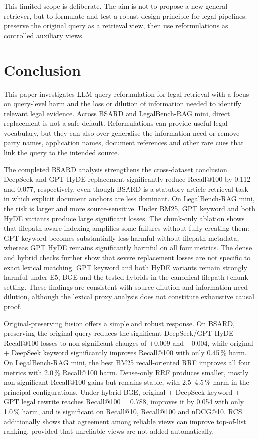 \documentclass[a4paper,fleqn]{cas-dc}
\begin{document}
This limited scope is deliberate. The aim is not to propose
a new general retriever, but to formulate and test a robust
design principle for legal pipelines: preserve the original
query as a retrieval view, then use reformulations as
controlled auxiliary views.

\section{Conclusion}
\label{sec:conclusion}

This paper investigates LLM query reformulation for legal
retrieval with a focus on query-level harm and the loss or
dilution of information needed to identify relevant legal
evidence. Across BSARD and LegalBench-RAG mini, direct
replacement is not a safe default. Reformulations can provide
useful legal vocabulary, but they can also over-generalise the
information need or remove party names, application names,
document references and other rare cues that link the query to
the intended source.

The completed BSARD analysis strengthens the cross-dataset
conclusion. DeepSeek and GPT HyDE replacement significantly
reduce Recall@100 by 0.112 and 0.077, respectively, even though
BSARD is a statutory article-retrieval task in which explicit
document anchors are less dominant. On LegalBench-RAG mini, the
risk is larger and more source-sensitive. Under BM25, GPT keyword
and both HyDE variants produce large significant losses. The
chunk-only ablation shows that filepath-aware indexing amplifies
some failures without fully creating them: GPT keyword becomes
substantially less harmful without filepath metadata, whereas
GPT HyDE remains significantly harmful on all four metrics.
The dense and hybrid checks further show that severe replacement
losses are not specific to exact lexical matching. GPT keyword
and both HyDE variants remain strongly harmful under E5, BGE and
the tested hybrids in the canonical filepath+chunk setting.
These findings are consistent with source dilution and
information-need dilution, although the lexical proxy analysis
does not constitute exhaustive causal proof.

Original-preserving fusion offers a simple and robust response.
On BSARD, preserving the original query reduces the significant
DeepSeek/GPT HyDE Recall@100 losses to non-significant changes of
$+0.009$ and $-0.004$, while original + DeepSeek keyword
significantly improves Recall@100 with only 0.45\,\% harm. On
LegalBench-RAG mini, the best BM25 recall-oriented RRF improves
all four metrics with 2.0\,\% Recall@100 harm. Dense-only RRF
produces smaller, mostly non-significant Recall@100 gains but
remains stable, with 2.5--4.5\,\% harm in the principal
configurations. Under hybrid BGE, original + DeepSeek keyword +
GPT legal rewrite reaches Recall@100 = 0.788, improves it by
0.054 with only 1.0\,\% harm, and is significant on Recall@10,
Recall@100 and nDCG@10. RCS additionally shows that agreement
among reliable views can improve top-of-list ranking, provided
that unreliable views are not added automatically.
\end{document}
